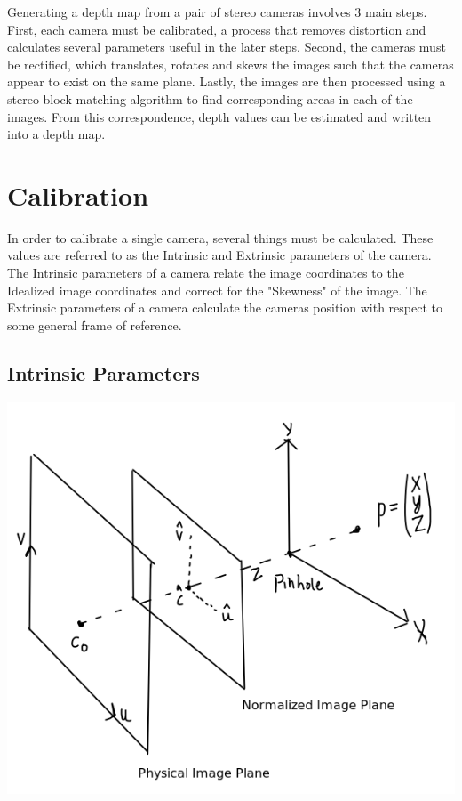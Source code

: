 \thispagestyle{plain}
Generating a depth map from a pair of stereo cameras involves 3 main steps.  First, each camera must be calibrated, a process that removes distortion and calculates several parameters useful in the later steps.  Second, the cameras must be rectified, which translates, rotates and skews the images such that the cameras appear to exist on the same plane.  Lastly, the images are then processed using a stereo block matching algorithm to find corresponding areas in each of the images.  From this correspondence, depth values can be estimated and written into a depth map.

\section{Calibration}
In order to calibrate a single camera, several things must be calculated.  These values are referred to as the Intrinsic and Extrinsic parameters of the camera.  The Intrinsic parameters of a camera relate the image coordinates to the Idealized image coordinates and correct for the "Skewness" of the image. The Extrinsic parameters of a camera calculate the cameras position with respect to some general frame of reference.


\subsection{Intrinsic Parameters}
\includegraphics[width=\textwidth]{Image1}

